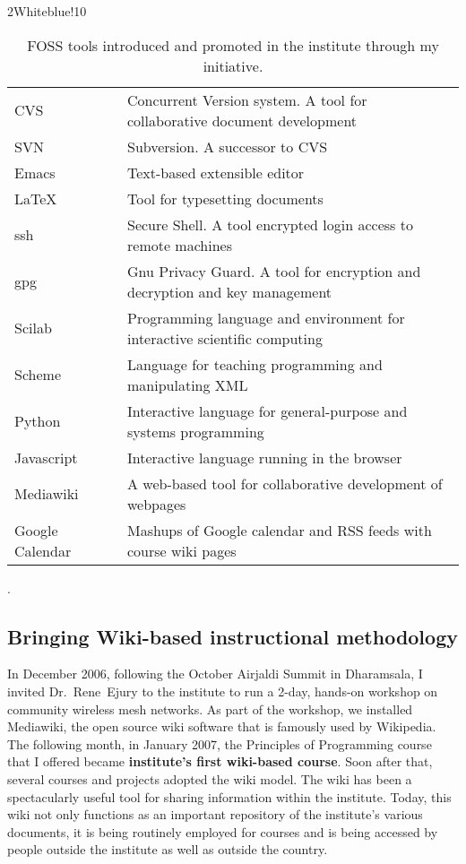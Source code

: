 \documentclass[titlepage, %
11pt, 
]{article}
\newcommand{\achievement}[1]{\textcolor{OliveGreen}{\bf #1}}
\begin{document}
\begin{table}
\rowcolors%
{2}{White}{blue!10}
\setlength\extrarowheight{4pt}
\begin{tabular}%
{|p{0.25\linewidth}|p{0.75\linewidth}|}
\hline
\multicolumn{1}{|m{0.25\linewidth}|}{\centering {\bf Tool Name}}&
\multicolumn{1}{m{0.75\linewidth}|}{\centering {\bf Description}}\\
\hline
CVS    & Concurrent Version system.  A tool for collaborative document development\\
SVN    & Subversion.  A successor to CVS\\
Emacs  & Text-based extensible editor\\
\LaTeX & Tool for typesetting documents\\
ssh    & Secure Shell.  A tool encrypted login access to remote machines\\
gpg    & Gnu Privacy Guard.  A tool for  encryption and decryption and key management\\
Scilab & Programming language and environment for interactive scientific computing\\
Scheme & Language for teaching programming and manipulating XML\\
Python & Interactive language for general-purpose and systems programming\\
Javascript & Interactive language running in the browser\\
Mediawiki & A web-based tool for collaborative development of webpages\\
Google Calendar &  Mashups of Google calendar and RSS feeds with course wiki pages\\
\hline
\end{tabular}
\caption{FOSS tools introduced and promoted in the institute through my initiative.\label{tbl:foss}}.
\end{table}


\subsection{Bringing Wiki-based instructional methodology}
\label{subsec:wiki}

In December 2006, following the October Airjaldi Summit in
Dharamsala, I invited Dr.~Rene~Ejury to the institute to run
a 2-day, hands-on workshop on community wireless mesh
networks.  As part of the workshop, we installed Mediawiki,
the open source wiki software that is famously used by
Wikipedia.  The following month, in January 2007, the
Principles of Programming course that I offered became
\achievement{institute's first wiki-based course}.  Soon
after that, several courses and projects adopted the wiki
model.  The wiki has been a spectacularly useful tool for
sharing information within the institute.  Today, this wiki
not only functions as an important repository of the
institute's various documents, it is being routinely
employed for courses and is being accessed by people outside
the institute as well as outside the country.
\end{document}
